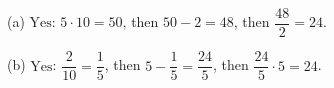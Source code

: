 (a) $\boxed{\text{Yes}}$: $5\cdot10=50$, then $50-2=48$, then $\dfrac{48}2=24$.

(b) $\boxed{\text{Yes}}$: $\dfrac2{10}=\dfrac15$, then $5-\dfrac15=\dfrac{24}5$, then $\dfrac{24}5\cdot5=24$.
